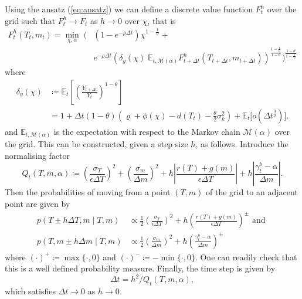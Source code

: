 \documentclass[../../main.tex]{subfiles}
\begin{document}
Using the ansatz (\ref{eq:ansatz}) we can define a discrete value function $F^h_t$ over the grid such that $F^h_t \to F_t$ as $h \to 0$ over $\chi$, that is \begin{equation} \label{eq:recursive-markov-chain}
    \begin{split}
        F_t^h(T_t, m_t) = \min_{\chi, \alpha} \; \Bigg( &\left(1 - e^{-\rho \Delta t}\right) \chi^{1 - \frac{1}{\psi}} + \\
        &e^{-\rho \Delta t} \left(\delta_y(\chi) \; \mathbb{E}_{t, \mathcal{M}(\alpha)}  F_{t + \Delta t}^h(T_{t + \Delta t}, m_{t + \Delta t})\right)^{\frac{1 - \frac{1}{\psi}}{1 - \theta}} \Bigg)^{\frac{1 - \theta}{1 - \frac{1}{\psi}}}
    \end{split}
\end{equation} where \begin{equation} 
    \begin{split}
        \delta_y(\chi) &\coloneqq \mathbb{E}_{t} \left[\left(\frac{Y_{t + \Delta t}}{Y_t}\right)^{1 - \theta}\right] \\
        &= 1 + \Delta t (1 - \theta) \left(\varrho + \phi(\chi) - d(T_t) - \frac{\theta}{2} \sigma^2_k \right) + \mathbb{E}_{t} \big[ o(\Delta t^{\frac{3}{2}}) \big].
    \end{split}
\end{equation} and $\mathbb{E}_{t, \mathcal{M}(\alpha)}$ is the expectation with respect to the Markov chain $\mathcal{M}(\alpha)$ over the grid. This can be constructed, given a step size $h$, as follows. Introduce the normalising factor \begin{equation}
    Q_t(T, m, \alpha) \coloneqq \left(\frac{\sigma_T}{ \epsilon \Delta T}\right)^2 + \left(\frac{\sigma_m}{\Delta m}\right)^2 + h \left\lvert \frac{r(T) + g(m)}{\epsilon \Delta T} \right\rvert + h \left\lvert \frac{\gamma^b_t - \alpha}{\Delta m} \right\rvert.
\end{equation} Then the probabilities of moving from a point $(T, m)$ of the grid to an adjacent point are given by \begin{align}
    p(T \pm h \Delta T, m \mid T, m) &\propto \frac{1}{2} \left(\frac{\sigma_T}{ \epsilon \Delta T}\right)^2 + h \left(\frac{r(T) + g(m)}{\epsilon \Delta T}\right)^{\pm} \text{ and } \\
    p(T, m \pm h \Delta m \mid T, m) &\propto \frac{1}{2} \left(\frac{\sigma_m}{\Delta m}\right)^2 + h \left(\frac{\gamma^b_t - \alpha}{\Delta m}\right)^{\pm}
\end{align} where $(\cdot)^{+} \coloneqq \max\{\cdot, 0\}$ and $(\cdot)^{-} \coloneqq -\min\{\cdot, 0\}$. One can readily check that this is a well defined probability measure. Finally, the time step is given by \begin{equation}
    \Delta t = h^2 / Q_t(T, m, \alpha),
\end{equation} which satisfies $\Delta t \to 0$ as $h \to 0$.
\end{document}
